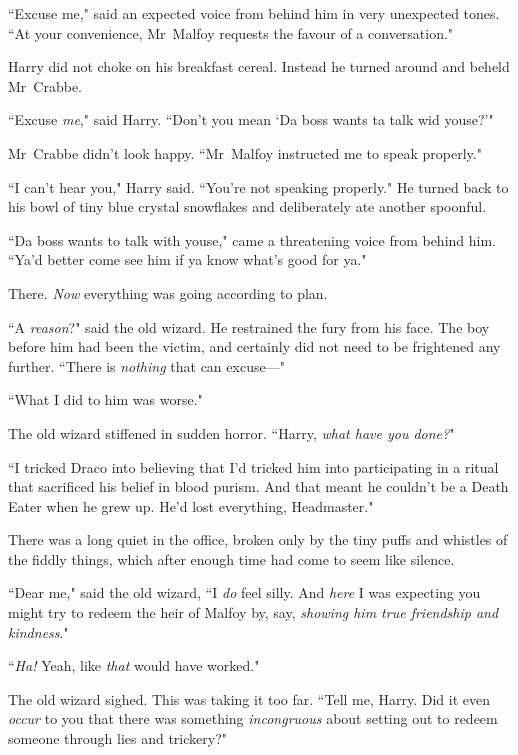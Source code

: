 ``Excuse me," said an expected voice from behind him in very unexpected tones. ``At your convenience, Mr~Malfoy requests the favour of a conversation."

Harry did not choke on his breakfast cereal. Instead he turned around and beheld Mr~Crabbe.

``Excuse \emph{me}," said Harry. ``Don't you mean `Da boss wants ta talk wid youse?'"

Mr~Crabbe didn't look happy. ``Mr~Malfoy instructed me to speak properly."

``I can't hear you," Harry said. ``You're not speaking properly." He turned back to his bowl of tiny blue crystal snowflakes and deliberately ate another spoonful.

``Da boss wants to talk with youse," came a threatening voice from behind him. ``Ya'd better come see him if ya know what's good for ya."

There. \emph{Now} everything was going according to plan.


``A \emph{reason}?" said the old wizard. He restrained the fury from his face. The boy before him had been the victim, and certainly did not need to be frightened any further. ``There is \emph{nothing} that can excuse—"

``What I did to him was worse."

The old wizard stiffened in sudden horror. ``Harry, \emph{what have you done?}"

``I tricked Draco into believing that I'd tricked him into participating in a ritual that sacrificed his belief in blood purism. And that meant he couldn't be a Death Eater when he grew up. He'd lost everything, Headmaster."

There was a long quiet in the office, broken only by the tiny puffs and whistles of the fiddly things, which after enough time had come to seem like silence.

``Dear me," said the old wizard, ``I \emph{do} feel silly. And \emph{here} I was expecting you might try to redeem the heir of Malfoy by, say, \emph{showing him true friendship and kindness}."

``\emph{Ha!} Yeah, like \emph{that} would have worked."

The old wizard sighed. This was taking it too far. ``Tell me, Harry. Did it even \emph{occur} to you that there was something \emph{incongruous} about setting out to redeem someone through lies and trickery?"

